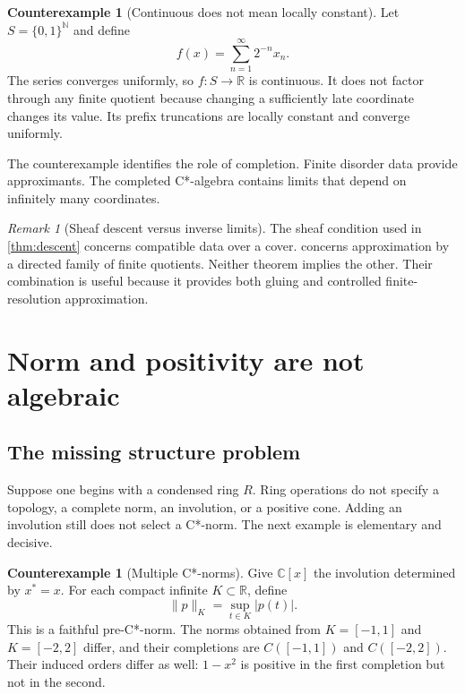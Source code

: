 \documentclass[12pt]{article}
\theoremstyle{definition}
\newtheorem{counterexample}[theorem]{Counterexample}
\theoremstyle{remark}
\newtheorem{remark}[theorem]{Remark}
\newcommand{\C}{\mathbb C}
\newcommand{\R}{\mathbb R}
\newcommand{\N}{\mathbb N}
\begin{document}
\begin{counterexample}[Continuous does not mean locally constant]\label{ce:cantor}
Let $S=\{0,1\}^{\N}$ and define
\[
f(x)=\sum_{n=1}^{\infty}2^{-n}x_n.
\]
The series converges uniformly, so $f:S\to\R$ is continuous.  It does not factor
through any finite quotient because changing a sufficiently late coordinate changes
its value.  Its prefix truncations are locally constant and converge uniformly.
\end{counterexample}

The counterexample identifies the role of completion.  Finite disorder data provide
approximants.  The completed C*-algebra contains limits that depend on infinitely
many coordinates.

\begin{remark}[Sheaf descent versus inverse limits]
The sheaf condition used in \cref{thm:descent} concerns compatible data over a cover.
 concerns approximation by a directed family of finite quotients.
Neither theorem implies the other.  Their combination is useful because it provides
both gluing and controlled finite-resolution approximation.
\end{remark}

\section{Norm and positivity are not algebraic}

\subsection{The missing structure problem}

Suppose one begins with a condensed ring $R$.  Ring operations do not specify a
topology, a complete norm, an involution, or a positive cone.  Adding an involution
still does not select a C*-norm.  The next example is elementary and decisive.

\begin{counterexample}[Multiple C*-norms]\label{ce:norms}
Give $\C[x]$ the involution determined by $x^*=x$.  For each compact infinite
$K\subset\R$, define
\[
\|p\|_K=\sup_{t\in K}|p(t)|.
\]
This is a faithful pre-C*-norm.  The norms obtained from $K=[-1,1]$ and
$K=[-2,2]$ differ, and their completions are $C([-1,1])$ and $C([-2,2])$.
Their induced orders differ as well: $1-x^2$ is positive in the first completion but
not in the second.
\end{counterexample}
\end{document}
